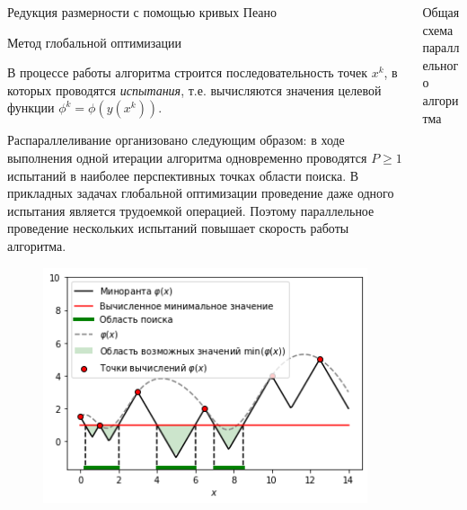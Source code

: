 \documentclass{beamer}
\begin{document}
\begin{frame}[t]
\begin{columns}[t]
\begin{column}[t]{0.47\paperwidth}
\begin{block}{Редукция размерности с помощью кривых Пеано}
\end{block}
\begin{block}{Метод глобальной оптимизации}

В процессе работы алгоритма строится последовательность точек \(x^k\), в которых проводятся \textit{испытания}, т.е. вычисляются значения целевой функции \(\phi^k=\phi(y(x^k))\). 

Распараллеливание организовано следующим образом: в ходе выполнения одной итерации алгоритма одновременно проводятся \(P \geq 1\) испытаний в наиболее перспективных точках области поиска. В прикладных задачах глобальной оптимизации проведение даже одного испытания является трудоемкой операцией. Поэтому параллельное проведение нескольких испытаний повышает скорость работы алгоритма. 

 \begin{minipage}[t]{.47\textwidth}
              \begin{figure}
                  \centering
                  \includegraphics[scale=2.05]{images/PlotGS_1.png}
              \end{figure}
              \end{minipage}
\end{block}
            
        \end{column}
        \begin{column}[t]{0.47\paperwidth}
          \begin{block}{Общая схема параллельного алгоритма}


\end{block}
\end{column}
\end{columns}
\end{frame}
\end{document}
